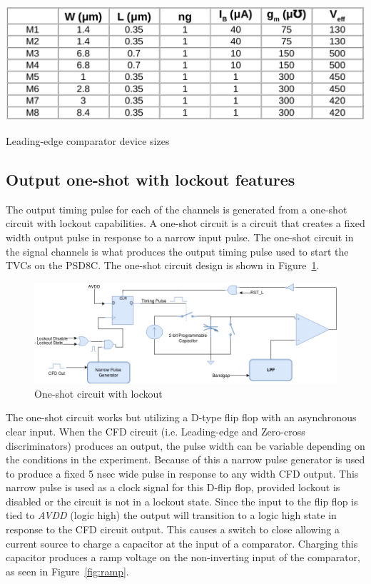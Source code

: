 \documentclass[12pt,oneside,final]{siuethesis}
\theoremstyle{definition}
\begin{document}
\begin{table}[htbp!]
 \centering
 \includegraphics[scale=.35,keepaspectratio=true]{./ch3_figures/le_cmp_sizes.png}
 \caption{Leading-edge comparator device sizes}
 \label{tab:le-comp-sizes}
\end{table}

\subsection{Output one-shot with lockout features}
\par The output timing pulse for each of the channels is generated from a one-shot circuit with lockout capabilities. A one-shot circuit is a circuit that creates a fixed width output pulse in response to a narrow input pulse. The one-shot circuit in the signal channels is what produces the output timing pulse used to start the TVCs on the PSD8C. The one-shot circuit design is shown in Figure~\ref{fig:oneshot-circuit}.

\begin{figure}[htbp!]
\centering
\includegraphics[scale=.50,keepaspectratio=true]{./ch3_figures/oneshot_circuit.png} 
\caption{One-shot circuit with lockout}
\label{fig:oneshot-circuit}
\end{figure}

\par The one-shot circuit works but utilizing a D-type flip flop with an asynchronous clear input. When the CFD circuit (i.e. Leading-edge and Zero-cross discriminators) produces an output, the pulse width can be variable depending on the conditions in the experiment. Because of this a narrow pulse generator is used to produce a fixed 5 nsec wide pulse in response to any width CFD output. This narrow pulse is used as a clock signal for this D-flip flop, provided lockout is disabled or the circuit is not in a lockout state. Since the input to the flip flop is tied to \emph{AVDD} (logic high) the output will transition to a logic high state in response to the CFD circuit output. This causes a switch to close allowing a current source to charge a capacitor at the input of a comparator. Charging this capacitor produces a ramp voltage on the non-inverting input of the comparator, as seen in Figure~\ref{fig:ramp}.
\end{document}
